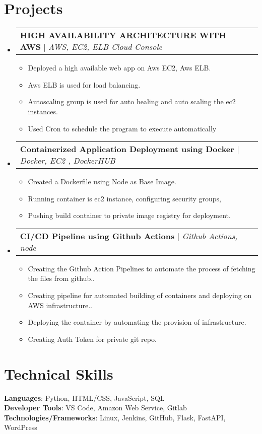 \documentclass[letterpaper,11pt]{article}
\makeatletter
\newcommand{\resumeItem}[1]{
  \item\small{
    {#1 \vspace{-2pt}}
  }
}
\newcommand{\resumeProjectHeading}[2]{
    \item
    \begin{tabular*}{1.001\textwidth}{l@{\extracolsep{\fill}}r}
      \small#1 & \textbf{\small #2}\\
    \end{tabular*}\vspace{-7pt}
}
\newcommand{\resumeSubHeadingListStart}{\begin{itemize}[leftmargin=0.0in, label={}]}
\newcommand{\resumeSubHeadingListEnd}{\end{itemize}}
\newcommand{\resumeItemListStart}{\begin{itemize}}
\newcommand{\resumeItemListEnd}{\end{itemize}\vspace{-5pt}}
\makeatother
\begin{document}
\section{Projects}
    \vspace{-5pt}
    \resumeSubHeadingListStart
      \resumeProjectHeading
          {\textbf{HIGH AVAILABILITY ARCHITECTURE WITH AWS} $|$ \emph{AWS, EC2, ELB Cloud Console}}{}
          \resumeItemListStart
            \resumeItem{Deployed a high available web app on Aws EC2, Aws ELB.}
            \resumeItem{Aws ELB is used for load balancing.}
            \resumeItem{Autoscaling group is used for auto healing and auto scaling the ec2 instances.}
            \resumeItem{Used Cron to schedule the program to execute automatically}
          \resumeItemListEnd %
          \vspace{-13pt}
      \resumeProjectHeading
          {\textbf{Containerized Application Deployment using Docker} $|$ \emph{Docker, EC2 , DockerHUB}}{}
          \resumeItemListStart
            \resumeItem{Created a Dockerfile using Node as Base Image.}
            \resumeItem{Running container is ec2 instance, configuring security groups, }
            \resumeItem{Pushing build container to private image registry for deployment.}
          \resumeItemListEnd 
          \vspace{-13pt}
          \resumeProjectHeading
          {\textbf{CI/CD Pipeline using Github Actions} $|$ \emph{Github Actions, node}}{}
          \resumeItemListStart
            \resumeItem{Creating the Github Action Pipelines to automate the process of fetching the files from github..}
            \resumeItem{Creating pipeline for automated building of containers and deploying on AWS infrastructure..}
            \resumeItem{Deploying the container by automating the provision of
infrastructure.}
            \resumeItem{Creating Auth Token for private git repo.}
          \resumeItemListEnd 
    \resumeSubHeadingListEnd
\vspace{-15pt}


%
\section{Technical Skills}
 \begin{itemize}[leftmargin=0.15in, label={}]
    \small{\item{
     \textbf{Languages}{: Python, HTML/CSS, JavaScript, SQL} \\
     \textbf{Developer Tools}{: VS Code, Amazon Web Service, Gitlab} \\
     \textbf{Technologies/Frameworks}{: Linux, Jenkins, GitHub, Flask, FastAPI, WordPress} }}
 \end{itemize}
 \vspace{-16pt}
\end{document}
